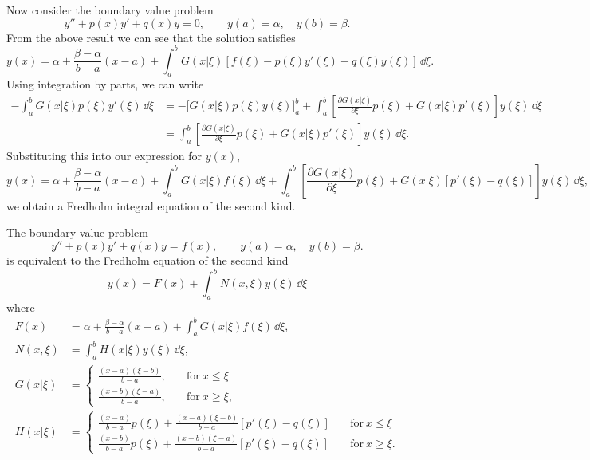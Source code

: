 Now consider the boundary value problem
\[
y'' + p(x) y' + q(x) y = 0, \qquad y(a) = \alpha, \quad y(b) = \beta.
\]
From the above result we can see that the solution satisfies
\[
y(x) = \alpha + \frac{\beta-\alpha}{b-a} (x-a)
+ \int_a^b G(x|\xi) [f(\xi)-p(\xi)y'(\xi)-q(\xi) y(\xi)] \,\dd \xi.
\]
Using integration by parts, we can write
\begin{align*}
  - \int_a^b G(x|\xi) p(\xi)y'(\xi)\,\dd \xi
  &= -\big[ G(x|\xi) p(\xi) y(\xi) \big]_a^b 
  + \int_a^b \left[\frac{\partial G(x|\xi)}{\partial \xi} p(\xi) 
    + G(x|\xi) p'(\xi) \right] y(\xi) \,\dd \xi \\
  &= \int_a^b \left[\frac{\partial G(x|\xi)}{\partial \xi} p(\xi) 
    + G(x|\xi) p'(\xi) \right] y(\xi) \,\dd \xi .
\end{align*}
Substituting this into our expression for $y(x)$, 
\[
y(x) = \alpha + \frac{\beta-\alpha}{b-a} (x-a)
+ \int_a^b G(x|\xi) f(\xi) \,\dd \xi
+ \int_a^b \left[\frac{\partial G(x|\xi)}{\partial \xi} p(\xi)+ G(x|\xi) [p'(\xi) 
  -q(\xi)] \right] y(\xi) \,\dd \xi,
\]
we obtain a Fredholm integral equation of the second kind.



\begin{Result}
  The boundary value problem
  \[
  y'' + p(x) y' + q(x) y = f(x), \qquad y(a)=\alpha, \quad y(b)=\beta.
  \]
  is equivalent to the Fredholm equation of the second kind
  \[
  y(x) = F(x) + \int_a^b N(x,\xi) y(\xi) \,\dd \xi
  \]
  where
  \begin{align*}
    F(x) &= \alpha + \frac{\beta-\alpha}{b-a} (x-a)
    + \int_a^b G(x|\xi) f(\xi) \,\dd \xi, \\
    N(x,\xi) &= \int_a^b H(x|\xi) y(\xi) \,\dd \xi, \\
    G(x|\xi) &= 
    \begin{cases}
      \frac{(x-a)(\xi-b)}{b-a}, \quad &\mathrm{for}\ x \leq \xi \\
      \frac{(x-b)(\xi-a)}{b-a}, \quad &\mathrm{for}\ x \geq \xi,
    \end{cases} \\
    H(x|\xi) &= 
    \begin{cases}
      \frac{(x-a)}{b-a} p(\xi) + \frac{(x-a)(\xi-b)}{b-a}[p'(\xi)-q(\xi)] 
      \quad &\mathrm{for}\ x \leq \xi \\
      \frac{(x-b)}{b-a} p(\xi) + \frac{(x-b)(\xi-a)}{b-a}[p'(\xi)-q(\xi)]
      \quad &\mathrm{for}\ x \geq \xi.
    \end{cases}
  \end{align*}
\end{Result}

























